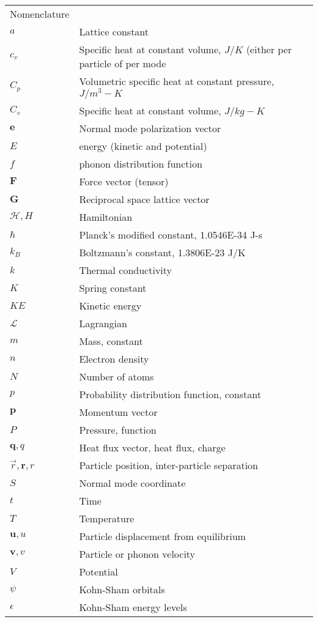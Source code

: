 \documentclass{article}
\numberwithin{equation}{section}
\begin{document}
\begin{tabular}{ l l }
  Nomenclature\\
  $a$ & Lattice constant \\
  $c_v$ & Specific heat at constant volume, $J/K$ (either per particle of per mode\\
  $C_p$ & Volumetric specific heat at constant pressure, $J/m^3-K$\\
  $C_v$ & Specific heat at constant volume, $J/kg-K$\\
  $\textbf{e}$ & Normal mode polarization vector\\
  $E$ & energy (kinetic and potential)\\
  $f$ & phonon distribution function\\
  $\textbf{F}$ & Force vector (tensor)\\
  $\textbf{G}$ & Reciprocal space lattice vector\\
  $\mathscr{H}, H$ & Hamiltonian \\
  $\hbar$ & Planck's modified constant, 1.0546E-34 J-s\\
  $k_B$ & Boltzmann's constant, 1.3806E-23 J/K\\
  $k$ & Thermal conductivity\\
  $K$ & Spring constant\\
  $KE$ & Kinetic energy\\
  $\mathscr{L}$ & Lagrangian \\
  $m$ & Mass, constant\\
  $n$ & Electron density\\
  $N$ & Number of atoms\\
  $p$ & Probability distribution function, constant\\
  $\textbf{p}$ & Momentum vector\\
  $P$ & Pressure, function\\
  $\textbf{q},q$ & Heat flux vector, heat flux, charge\\
  $\vec{r},\textbf{r},r$ & Particle position, inter-particle separation\\
  $S$ & Normal mode coordinate\\
  $t$ & Time\\
  $T$ & Temperature\\
  $\textbf{u},u$ & Particle displacement from equilibrium\\
  $\textbf{v},v$ & Particle or phonon velocity\\
  $V$ & Potential\\
  $\psi$ & Kohn-Sham orbitals\\
  $\epsilon$ & Kohn-Sham energy levels\\
\end{tabular}
\end{document}
